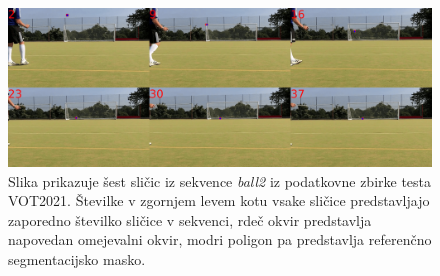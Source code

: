 \documentclass[a4paper,12pt,openright]{book}
\begin{document}
\begin{figure}[htb]
    \begin{center}
        \includegraphics[width=1\textwidth]{img/tracking_ball2.png}
    \end{center}
    \caption{Slika prikazuje šest sličic iz sekvence \emph{ball2} iz podatkovne zbirke testa VOT2021. Številke v zgornjem levem kotu vsake sličice predstavljajo zaporedno številko sličice v sekvenci, rdeč okvir predstavlja napovedan omejevalni okvir, modri poligon pa predstavlja referenčno segmentacijsko masko.}
    \label{img:ball2}
\end{figure}



\end{document}

